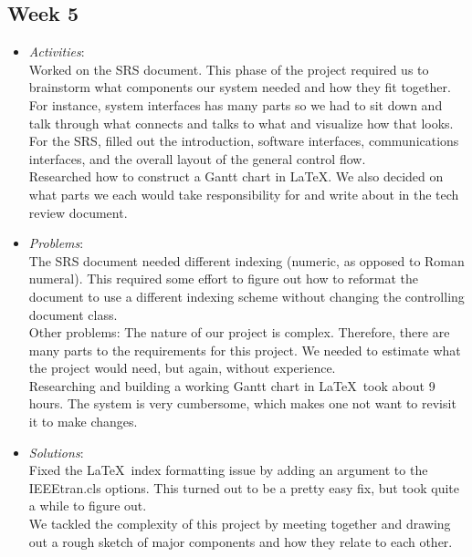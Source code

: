 \documentclass[compsoc,draftclsnofoot,onecolumn,10pt]{IEEEtran}
\begin{document}
\subsection{Week 5}
	\begin{itemize}
        \item \textit{Activities}:\\
            Worked on the SRS document. This phase of the project required us to
            brainstorm what components our system needed and how they fit
            together.\\
            For instance, system interfaces has many parts so we had to sit down
            and talk through what connects and talks to what and visualize how
            that looks. For the SRS, filled out the introduction, software
            interfaces, communications interfaces, and the overall layout of the
            general control flow.\\
            Researched how to construct a Gantt chart in \LaTeX. We also decided
            on what parts we each would take responsibility for and write about
            in the tech review document.

        \item \textit{Problems}:\\
            The SRS document needed different indexing (numeric, as opposed to
            Roman numeral). This required some effort to figure out how to
            reformat the document to use a different indexing scheme without
            changing the controlling document class.\\  
            Other problems: 
            The nature of our project is complex. Therefore,
            there are many parts to the requirements for this project. We needed
            to estimate what the project would need, but again, without
            experience.\\
            Researching and building a working Gantt chart in \LaTeX~took about
            9 hours. The system is very cumbersome, which makes one not want to
            revisit it to make changes.

        \item \textit{Solutions}:\\
            Fixed the \LaTeX~index formatting issue by adding an argument to the
            IEEEtran.cls options. This turned out to be a pretty easy fix, but
            took quite a while to figure out.\\
            We tackled the complexity of this project by meeting together and
            drawing out a rough sketch of major components and how they relate
            to each other.\\


\end{itemize}
\end{document}
